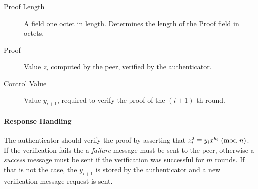 \begin{description}
	\item [Proof Length] A field one octet in length. Determines the length of the Proof field in octets.
	\item [Proof] Value $z_i$ computed by the peer, verified by the authenticator.
	\item [Control Value] Value $y_{i+1}$, required to verify the proof of the $(i+1)$-th round.
\end{description}

\paragraph{Response Handling}
The authenticator should verify the proof by asserting that $z_i^2 \equiv y_ix^{b_i} \ (\mathrm{mod}\ n)$.
If the verification fails the a \textit{failure} message must be sent to the peer, otherwise a \textit{success} message must be sent if the verification was successful for $m$ rounds.
If that is not the case, the $y_{i+1}$ is stored by the authenticator and a new verification message request is sent.
